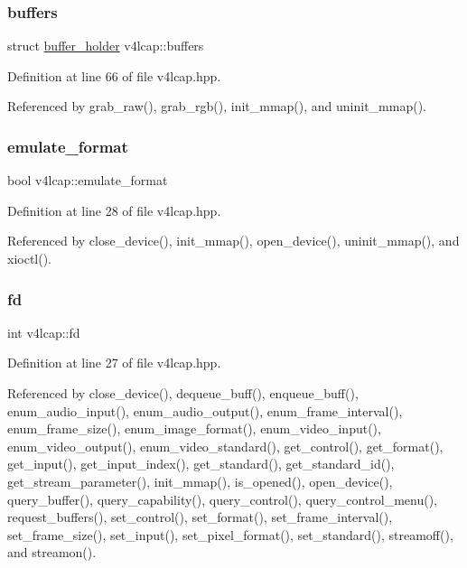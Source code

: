 \subsubsection{\texorpdfstring{buffers}{buffers}}
{\footnotesize\ttfamily struct \hyperlink{structv4lcap_1_1buffer__holder}{buffer\+\_\+holder} v4lcap\+::buffers}



Definition at line 66 of file v4lcap.\+hpp.



Referenced by grab\+\_\+raw(), grab\+\_\+rgb(), init\+\_\+mmap(), and uninit\+\_\+mmap().

\mbox{\label{classv4lcap_a21b4c152f56ecc309a490cb8ab4ce117}} 
\subsubsection{\texorpdfstring{emulate\+\_\+format}{emulate\_format}}
{\footnotesize\ttfamily bool v4lcap\+::emulate\+\_\+format}



Definition at line 28 of file v4lcap.\+hpp.



Referenced by close\+\_\+device(), init\+\_\+mmap(), open\+\_\+device(), uninit\+\_\+mmap(), and xioctl().

\mbox{\label{classv4lcap_a38109593bde997dad13b3a461569573d}} 
\subsubsection{\texorpdfstring{fd}{fd}}
{\footnotesize\ttfamily int v4lcap\+::fd}



Definition at line 27 of file v4lcap.\+hpp.



Referenced by close\+\_\+device(), dequeue\+\_\+buff(), enqueue\+\_\+buff(), enum\+\_\+audio\+\_\+input(), enum\+\_\+audio\+\_\+output(), enum\+\_\+frame\+\_\+interval(), enum\+\_\+frame\+\_\+size(), enum\+\_\+image\+\_\+format(), enum\+\_\+video\+\_\+input(), enum\+\_\+video\+\_\+output(), enum\+\_\+video\+\_\+standard(), get\+\_\+control(), get\+\_\+format(), get\+\_\+input(), get\+\_\+input\+\_\+index(), get\+\_\+standard(), get\+\_\+standard\+\_\+id(), get\+\_\+stream\+\_\+parameter(), init\+\_\+mmap(), is\+\_\+opened(), open\+\_\+device(), query\+\_\+buffer(), query\+\_\+capability(), query\+\_\+control(), query\+\_\+control\+\_\+menu(), request\+\_\+buffers(), set\+\_\+control(), set\+\_\+format(), set\+\_\+frame\+\_\+interval(), set\+\_\+frame\+\_\+size(), set\+\_\+input(), set\+\_\+pixel\+\_\+format(), set\+\_\+standard(), streamoff(), and streamon().

